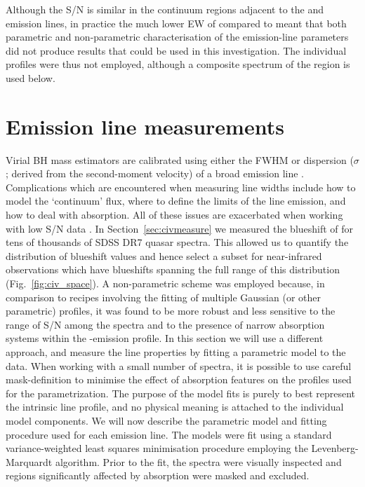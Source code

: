 Although the S/N is similar in the continuum regions adjacent to the \ha and \hb emission lines, in practice the much lower EW of \hb compared to \ha meant that both parametric and non-parametric characterisation of the emission-line parameters did not produce results that could be used in this investigation. 
The individual \hb profiles were thus not employed, although a composite spectrum of the \hb region is used below.

\section{Emission line measurements} %
\label{sec:line_measurements}

Virial BH mass estimators are calibrated using either the FWHM or dispersion ($\sigma$; derived from the second-moment velocity) of a broad emission line \citep[e.g.][]{vestergaard06,park13}. 
Complications which are encountered when measuring line widths include how to model the `continuum' flux, where to define the limits of the line emission, and how to deal with absorption. 
All of these issues are exacerbated when working with low S/N data \citep[see][for a discussion]{denney13}. 
In Section~\ref{sec:civmeasure} we measured the blueshift of  for tens of thousands of SDSS DR7 quasar spectra. 
This allowed us to quantify the distribution of  blueshift values and hence select a subset for near-infrared observations which have  blueshifts spanning the full range of this distribution (Fig.~\ref{fig:civ_space}).
A non-parametric scheme was employed because, in comparison to recipes involving the fitting of multiple Gaussian (or other parametric) profiles, it was found to be more robust and less sensitive to the range of S/N among the spectra and to the presence of narrow absorption systems within the -emission profile.
In this section we will use a different approach, and measure the line properties by fitting a parametric model to the data. 
When working with a small number of spectra, it is possible to use careful mask-definition to minimise the effect of absorption features on the profiles used for the parametrization.
The purpose of the model fits is purely to best represent the intrinsic line profile, and no physical meaning is attached to the individual model components. 
We will now describe the parametric model and fitting procedure used for each emission line. 
The models were fit using a standard variance-weighted least squares minimisation procedure employing the Levenberg-Marquardt algorithm. 
Prior to the fit, the spectra were visually inspected and regions significantly affected by absorption were masked and excluded.

